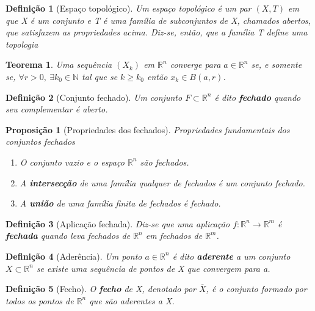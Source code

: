 \documentclass[12pt]{article}
\newtheorem{prop}{Proposição}
\newtheorem{theorem}{Teorema}
\newtheorem{definition}{Definição}
\begin{document}
\begin{definition}[Espaço topológico]
Um espaço topológico é um par $(X, T)$ em que X é um conjunto e T é uma família de subconjuntos de X, chamados abertos, que satisfazem as propriedades acima. Diz-se, então, que a família T define uma topologia
\end{definition}

\begin{theorem}
Uma sequência $(X_k)$ em $\mathbb{R}^n$ converge para $a \in \mathbb{R}^n$ se, e somente se, $\forall r > 0,\ \exists k_0 \in \mathbb{N}$ tal que se $k \geq k_0$ então $x_k \in B(a, r)$.
\end{theorem}

\begin{definition}[Conjunto fechado]
Um conjunto $F \subset \mathbb{R}^n$ é dito \textbf{fechado} quando seu complementar é aberto.
\end{definition}

\begin{prop}[Propriedades dos fechados]
Propriedades fundamentais dos conjuntos fechados

\begin{enumerate}
    \item O conjunto vazio e o espaço $\mathbb{R}^n$ são fechados.
    
    \item A \textbf{intersecção} de uma família qualquer de fechados é um conjunto fechado.
    
    \item A \textbf{união} de uma família finita de fechados é fechado.
\end{enumerate}
\end{prop}

\begin{definition}[Aplicação fechada]
Diz-se que uma aplicação $f: \mathbb{R}^n \rightarrow \mathbb{R}^m$ é \textbf{fechada} quando leva fechados de $\mathbb{R}^n$ em fechados de $\mathbb{R}^m$.
\end{definition}

\begin{definition}[Aderência]
Um ponto $a \in \mathbb{R}^n$ é dito \textbf{aderente} a um conjunto $X \subset \mathbb{R}^n$ se existe uma sequência de pontos de X que convergem para a.
\end{definition}

\begin{definition}[Fecho]
O \textbf{fecho} de X, denotado por $\overline{X}$, é o conjunto formado por todos os pontos de $\mathbb{R}^n$ que são aderentes a X.
\end{definition}
\end{document}
